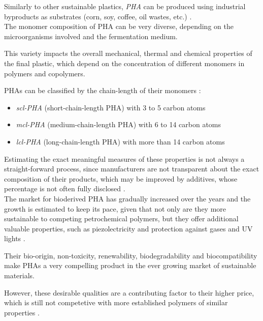 \documentclass{article}
\begin{document}
    Similarly to other sustainable plastics, \textit{PHA} can be produced using industrial byproducts as substrates (corn, soy, coffee, oil wastes, etc.)
    \autocite{Kovalcik_PHA_Review}. \\ 

    The monomer composition of PHA can be very diverse, depending on the microorganisms involved and the fermentation medium. 
    
    This variety impacts the overall mechanical, thermal and chemical properties of the final plastic, which depend on the concentration of 
    different monomers in polymers and copolymers. 

    PHAs can be classified by the chain-length of their monomers \autocite*{Messori_Bondioli_PHAs}: 

    \begin{itemize}
        \item \textit{scl-PHA} (short-chain-length PHA) with 3 to 5 carbon atoms
        \item \textit{mcl-PHA} (medium-chain-length PHA) with 6 to 14 carbon atoms
        \item \textit{lcl-PHA} (long-chain-length PHA) with more than 14 carbon atoms
    \end{itemize}


    Estimating the exact meaningful measures of these properties is not always a straight-forward process, 
    since manufacturers are not transparent about the exact composition of their products, which may be 
    improved by additives, whose percentage is not often fully disclosed \autocite{Kovalcik_PHA_Review}. \\ 
    
    The market for bioderived PHA has gradually increased over the years and the growth is estimated to keep its pace, given that not only are they more sustainable
    to competing petrochemical polymers, but they offer additional valuable properties, such as piezolectricity 
    and protection against gases and UV lights \autocite{Kovalcik_PHA_Review}.

    Their bio-origin, non-toxicity, renewability, biodegradability and biocompatibility make PHAs a very compelling product in the 
    ever growing market of sustainable materials. 

    However, these desirable qualities are a contributing factor to their higher price, which is still not competetive with more established 
    polymers of similar properties \autocite{Kovalcik_PHA_Review}. 
\end{document}
